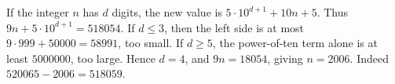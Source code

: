If the integer $n$ has $d$ digits, the new value is $5\cdot10^{d+1}+10n+5$. Thus $9n+5\cdot10^{d+1}=518054$. If $d\le3$, then the left side is at most $9\cdot999+50000=58991$, too small. If $d\ge5$, the power-of-ten term alone is at least $5000000$, too large. Hence $d=4$, and $9n=18054$, giving $\boxed{n=2006}$. Indeed $520065-2006=518059$.
